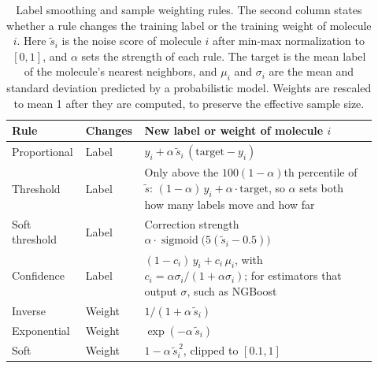 \begin{table}[htbp]
\centering
\small
\begin{adjustbox}{max width=\textwidth}
\begin{tabular}{@{}P{0.17\linewidth}P{0.13\linewidth}P{0.62\linewidth}@{}}
\toprule
Rule & Changes & New label or weight of molecule $i$ \\
\midrule
Proportional & Label & $y_i + \alpha\,\tilde s_i\,(\text{target} - y_i)$ \\
Threshold & Label & Only above the $100(1-\alpha)$th percentile of $\tilde s$: $(1-\alpha)\,y_i + \alpha\cdot\text{target}$, so $\alpha$ sets both how many labels move and how far \\
Soft threshold & Label & Correction strength $\alpha \cdot \operatorname{sigmoid}\!\big(5(\tilde s_i - 0.5)\big)$ \\
Confidence & Label & $(1-c_i)\,y_i + c_i\,\mu_i$, with $c_i = \alpha\sigma_i / (1 + \alpha\sigma_i)$; for estimators that output $\sigma$, such as NGBoost \\
Inverse & Weight & $1 / (1 + \alpha\,\tilde s_i)$ \\
Exponential & Weight & $\exp(-\alpha\,\tilde s_i)$ \\
Soft & Weight & $1 - \alpha\,\tilde s_i^{\,2}$, clipped to $[0.1, 1]$ \\
\bottomrule
\end{tabular}
\end{adjustbox}
\caption[Label smoothing and sample weighting rules.]{Label smoothing and sample weighting rules. The second column states whether a rule changes the training label or the training weight of molecule $i$. Here $\tilde s_i$ is the noise score of molecule $i$ after min-max normalization to $[0, 1]$, and $\alpha$ sets the strength of each rule. The target is the mean label of the molecule's nearest neighbors, and $\mu_i$ and $\sigma_i$ are the mean and standard deviation predicted by a probabilistic model. Weights are rescaled to mean 1 after they are computed, to preserve the effective sample size.}
\label{tab:noise_corrections}
\end{table}

